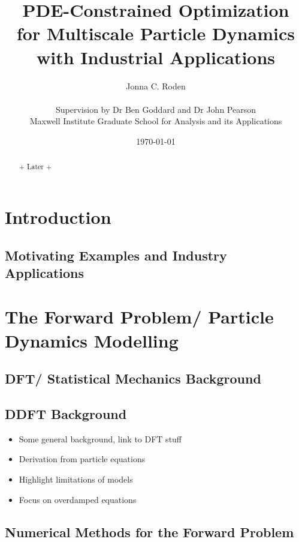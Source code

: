 \documentclass[11pt, a4paper]{article}
\title{{\huge PDE-Constrained Optimization \\for Multiscale Particle Dynamics} \\ with Industrial Applications}
\author{Jonna C. Roden\\ \\Supervision by Dr Ben Goddard and Dr John Pearson\\ \vspace{0.5cm} Maxwell Institute Graduate School for Analysis and its Applications}
\date{\today}
\theoremstyle{definition}
\begin{document}
	\maketitle
\begin{abstract}
+ Later +
	
\end{abstract}

\newpage
{} 
\tableofcontents
\newpage
{} 

	
	
	\section{Introduction}
	\subsection{Motivating Examples and Industry Applications}
	
	
	
	
	
	
	\section{The Forward Problem/ Particle Dynamics Modelling}
	
	\subsection{DFT/ Statistical Mechanics Background}
	
	\subsection{DDFT Background}
		\begin{itemize}
			\item Some general background, link to DFT stuff
			\item Derivation from particle equations
			\item Highlight limitations of models
			\item Focus on overdamped equations
		\end{itemize}
		
	
	\subsection{Numerical Methods for the Forward Problem}
	
\end{document}
